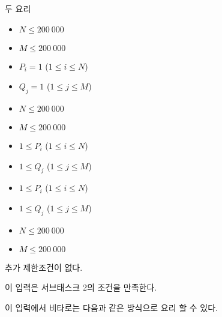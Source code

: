 \begin{problem}{두 요리}
	\begin{itemize}
		\item $N \le 200\ 000$
		\item $M \le 200\ 000$
		\item $P_i = 1$ ($1 \le i \le N$)
		\item $Q_j = 1$ ($1 \le j \le M$)
	\end{itemize}



	\begin{itemize}
		\item $N \le 200\ 000$
		\item $M \le 200\ 000$
		\item $1 \le P_i$ ($1 \le i \le N$)
		\item $1 \le Q_j$ ($1 \le j \le M$)
	\end{itemize}

	\begin{itemize}
		\item $1 \le P_i$ ($1 \le i \le N$)
		\item $1 \le Q_j$ ($1 \le j \le M$)
	\end{itemize}

	\begin{itemize}
		\item $N \le 200\ 000$
		\item $M \le 200\ 000$
	\end{itemize}

	
	
	추가 제한조건이 없다.
	
	\Examples
	
	\begin{example}
	\end{example}
	
	이 입력은 서브태스크 2의 조건을 만족한다.
	
	이 입력에서 비타로는 다음과 같은 방식으로 요리 할 수 있다.
	

\end{problem}
